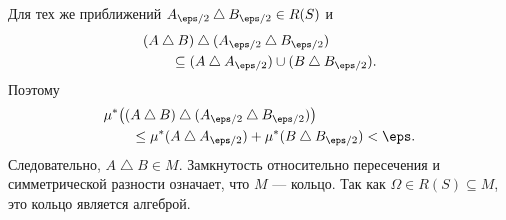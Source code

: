 \begin{Proof}
    Для тех же приближений
    $A_{\eps/2}\mathbin{\triangle}B_{\eps/2}\in R(S)$ и
    \[
        \begin{aligned}
            &(A\mathbin{\triangle}B)\mathbin{\triangle}
                (A_{\eps/2}\mathbin{\triangle}B_{\eps/2})\\
            &\qquad\subseteq
                (A\mathbin{\triangle}A_{\eps/2})
                \cup(B\mathbin{\triangle}B_{\eps/2}).
        \end{aligned}
    \]
    Поэтому
    \[
        \begin{aligned}
            &\mu^*\bigl((A\mathbin{\triangle}B)\mathbin{\triangle}
                (A_{\eps/2}\mathbin{\triangle}B_{\eps/2})\bigr)\\
            &\qquad\leq\mu^*(A\mathbin{\triangle}A_{\eps/2})
                      +\mu^*(B\mathbin{\triangle}B_{\eps/2})<\eps.
        \end{aligned}
    \]
    Следовательно, $A\mathbin{\triangle}B\in M$.
    Замкнутость относительно пересечения и симметрической разности
    означает, что $M$ --- кольцо. Так как $\Omega\in R(S)\subseteq M$,
    это кольцо является алгеброй.
\end{Proof}
\endgroup
